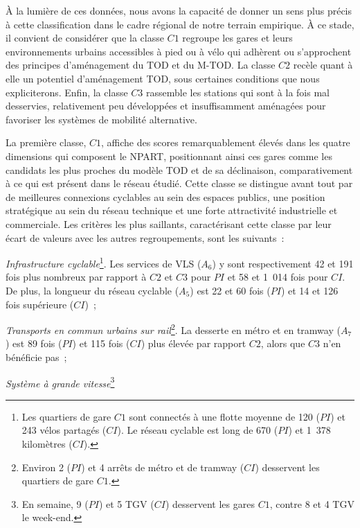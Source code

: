 \begin{refsegment}
À la lumière de ces données, nous avons la capacité de donner un sens plus précis à cette classification dans le cadre régional de notre terrain empirique. À ce stade, il convient de considérer que la classe \(C1\) regroupe les gares et leurs environnements urbains accessibles à pied ou à vélo qui adhèrent ou s’approchent des principes d’aménagement du \acrshort{TOD} et du \acrshort{M-TOD}. La classe \(C2\) recèle quant à elle un potentiel d’aménagement \acrshort{TOD}, sous certaines conditions que nous expliciterons. Enfin, la classe \(C3\) rassemble les stations qui sont à la fois mal desservies, relativement peu développées et insuffisamment aménagées pour favoriser les systèmes de mobilité alternative.%

La première classe, \(C1\), affiche des scores remarquablement élevés dans les quatre dimensions qui composent le \acrshort{NPART}, positionnant ainsi ces gares comme les candidats les plus proches du modèle \acrshort{TOD} et de sa déclinaison, comparativement à ce qui est présent dans le réseau étudié. Cette classe se distingue avant tout par de meilleures connexions cyclables au sein des espaces publics, une position stratégique au sein du réseau technique et une forte attractivité industrielle et commerciale. Les critères les plus saillants, caractérisant cette classe par leur écart de valeurs avec les autres regroupements, sont les suivants~:
\begin{customitemize}
    \item \textsl{Infrastructure cyclable}\footnote{
        Les quartiers de gare \(C1\) sont connectés à une flotte moyenne de 120 (\(PI\)) et 243 vélos partagés (\(CI\)). Le réseau cyclable est long de 670 (\(PI\)) et 1~378 kilomètres (\(CI\)).
    }. Les services de \acrshort{VLS} (\(A_{6}\)) y sont respectivement 42 et 191 fois plus nombreux par rapport à \(C2\) et \(C3\) pour \(PI\) et 58 et 1~014 fois pour \(CI\). De plus, la longueur du réseau cyclable (\(A_{5}\)) est 22 et 60 fois (\(PI\)) et 14 et 126 fois supérieure (\(CI\))~;
    \item \textsl{Transports en commun urbains sur rail}\footnote{
        Environ 2 (\(PI\)) et 4 arrêts de métro et de tramway (\(CI\)) desservent les quartiers de gare \(C1\).
    }. La desserte en métro et en tramway (\(A_{7}\)) est 89 fois (\(PI\)) et 115 fois (\(CI\)) plus élevée par rapport \(C2\), alors que \(C3\) n'en bénéficie pas~;
    \item \textsl{Système à grande vitesse}\footnote{
        En semaine, 9 (\(PI\)) et 5 \acrshort{TGV} (\(CI\)) desservent les gares \(C1\), contre 8 et 4 \acrshort{TGV} le week-end.
}
\end{customitemize}
\end{refsegment}
